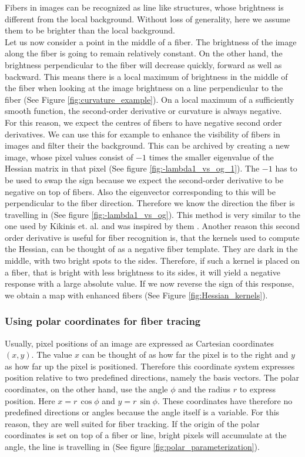 \documentclass[12pt,english,twocolumn]{revtex4}
\begin{document}
Fibers in images can be recognized as line like structures, whose brightness is different from the local background. Without loss of generality, here we assume them to be brighter than the local background.\\

Let us now consider a point in the middle of a fiber. The brightness of the image along the fiber is going to remain relatively constant. On the other hand, the brightness perpendicular to the fiber will decrease quickly, forward as well as backward. This means there is a local maximum of brightness in the middle of the fiber when looking at the image brightness on a line perpendicular to the fiber (See Figure \ref{fig:curvature_example}).  On a local maximum of a sufficiently smooth function, the second-order derivative or curvature is always negative.\\


For this reason, we expect the centres of fibers to have negative second order derivatives. We can use this for example to enhance the visibility of fibers in images and filter their the background. This can be archived by creating a new image, whose pixel values consist of $-1$ times the smaller eigenvalue of the Hessian matrix in that pixel (See figure \ref{fig:-lambda1_vs_og_1}). The $-1$ has to be used to swap the sign because we expect the second-order derivative to be negative on top of fibers. Also the eigenvector corresponding to this will be perpendicular to the fiber direction. Therefore we know the direction the fiber is travelling in (See figure \ref{fig:-lambda1_vs_og}). This method is very similar to the one used by Kikinis et. al. and was inspired by them \cite{tubeness_paper}. Another reason this second order derivative is useful for fiber recognition is, that the kernels used to compute the Hessian, can be thought of as a negative fiber template. They are dark in the middle, with two bright spots to the sides. Therefore, if such a kernel is placed on a fiber, that is bright with less brightness to its sides, it will yield a negative response with a large absolute value. If we now reverse the sign of this response, we obtain a map with enhanced fibers (See Figure \ref{fig:Hessian_kernels}).
\subsubsection{Using polar coordinates for fiber tracing} \label{sec:polar}
Usually, pixel positions of an image are expressed as Cartesian coordinates $(x,y)$. The value $x$ can be thought of as how far the pixel is to the right and $y$ as how far up the pixel is positioned. Therefore this coordinate system expresses position relative to two predefined directions, namely the basis vectors. The polar coordinates, on the other hand, use the angle $\phi$ and the radius $r$ to express position. Here $x = r \, \cos{\phi}$ and $y = r \, \sin{\phi}$. These coordinates have therefore no predefined directions or angles because the angle itself is a variable. For this reason, they are well suited for fiber tracking. If the origin of the polar coordinates is set on top of a fiber or line, bright pixels will accumulate at the angle, the line is travelling in (See figure \ref{fig:polar_parameterization}).  \cite{victor_small}
\end{document}
